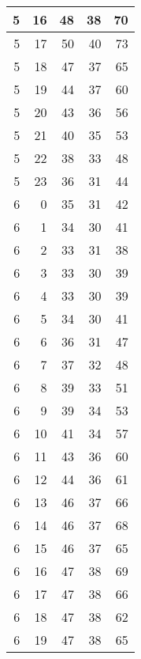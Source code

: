 \begin{longtable}{|r|r|r|r|r|}
    \hline
    5     & 16    & 48    & 38    & 70 \\
    \hline
    5     & 17    & 50    & 40    & 73 \\
    \hline
    5     & 18    & 47    & 37    & 65 \\
    \hline
    5     & 19    & 44    & 37    & 60 \\
    \hline
    5     & 20    & 43    & 36    & 56 \\
    \hline
    5     & 21    & 40    & 35    & 53 \\
    \hline
    5     & 22    & 38    & 33    & 48 \\
    \hline
    5     & 23    & 36    & 31    & 44 \\
    \hline
    6     & 0     & 35    & 31    & 42 \\
    \hline
    6     & 1     & 34    & 30    & 41 \\
    \hline
    6     & 2     & 33    & 31    & 38 \\
    \hline
    6     & 3     & 33    & 30    & 39 \\
    \hline
    6     & 4     & 33    & 30    & 39 \\
    \hline
    6     & 5     & 34    & 30    & 41 \\
    \hline
    6     & 6     & 36    & 31    & 47 \\
    \hline
    6     & 7     & 37    & 32    & 48 \\
    \hline
    6     & 8     & 39    & 33    & 51 \\
    \hline
    6     & 9     & 39    & 34    & 53 \\
    \hline
    6     & 10    & 41    & 34    & 57 \\
    \hline
    6     & 11    & 43    & 36    & 60 \\
    \hline
    6     & 12    & 44    & 36    & 61 \\
    \hline
    6     & 13    & 46    & 37    & 66 \\
    \hline
    6     & 14    & 46    & 37    & 68 \\
    \hline
    6     & 15    & 46    & 37    & 65 \\
    \hline
    6     & 16    & 47    & 38    & 69 \\
    \hline
    6     & 17    & 47    & 38    & 66 \\
    \hline
    6     & 18    & 47    & 38    & 62 \\
    \hline
    6     & 19    & 47    & 38    & 65 \\

\end{longtable}
